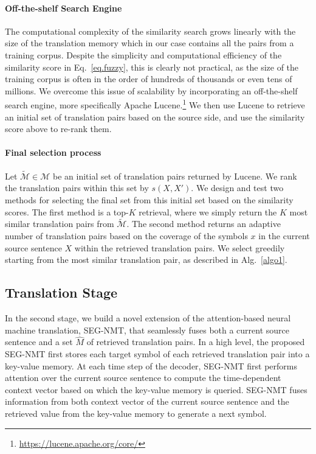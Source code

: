 \vspace{-7pt}
\paragraph{Off-the-shelf Search Engine}

The computational complexity of the similarity search grows linearly with the size of the translation memory which in our case contains all the pairs from a training corpus. Despite the simplicity and computational efficiency of the similarity score in Eq.~\eqref{eq.fuzzy}, this is clearly not practical, as the size of the training corpus is often in the order of hundreds of thousands or even tens of millions. We overcome this issue of scalability by incorporating an off-the-shelf search engine, more specifically Apache Lucene.\footnote{
\url{https://lucene.apache.org/core/}
} 
We then use Lucene to retrieve an initial set of translation pairs based on the source side, and use the similarity score above to re-rank them. 


\vspace{-7pt}
\paragraph{Final selection process}
Let $\tilde{\mathcal{M}} \in \mathcal{M}$ be an initial set of translation pairs returned by Lucene. We rank the translation pairs within this set by $s(X, X')$. We design and test two methods for selecting the final set from this initial set based on the similarity scores. The first method is a top-$K$ retrieval, where we simply return the $K$ most similar translation pairs from $\tilde{\mathcal{M}}$. The second method returns an adaptive number of translation pairs based on the coverage of the symbols $x$ in the current source sentence $X$ within the retrieved translation pairs. We select greedily starting from the most similar translation pair, as described in Alg.~\ref{algo1}. 


\subsection{Translation Stage} 
In the second stage, we build a novel extension of the attention-based neural machine translation, SEG-NMT, that seamlessly fuses both a current source sentence and a set $\hat{M}$ of retrieved translation pairs. In a high level, the proposed SEG-NMT first stores each target symbol of each retrieved translation pair into a key-value memory\citep{miller2016key}. At each time step of the decoder, SEG-NMT first performs attention over the current source sentence to compute the time-dependent context vector based on which the key-value memory is queried. SEG-NMT fuses information from both context vector of the current source sentence and the retrieved value from the key-value memory to generate a next symbol. 

